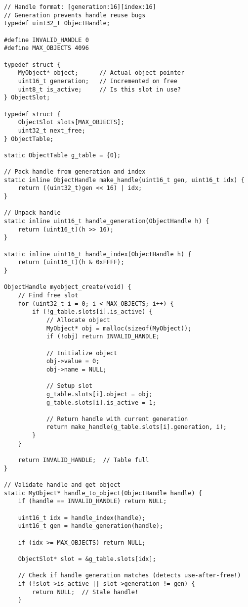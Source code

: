\begin{lstlisting}
// Handle format: [generation:16][index:16]
// Generation prevents handle reuse bugs
typedef uint32_t ObjectHandle;

#define INVALID_HANDLE 0
#define MAX_OBJECTS 4096

typedef struct {
    MyObject* object;      // Actual object pointer
    uint16_t generation;   // Incremented on free
    uint8_t is_active;     // Is this slot in use?
} ObjectSlot;

typedef struct {
    ObjectSlot slots[MAX_OBJECTS];
    uint32_t next_free;
} ObjectTable;

static ObjectTable g_table = {0};

// Pack handle from generation and index
static inline ObjectHandle make_handle(uint16_t gen, uint16_t idx) {
    return ((uint32_t)gen << 16) | idx;
}

// Unpack handle
static inline uint16_t handle_generation(ObjectHandle h) {
    return (uint16_t)(h >> 16);
}

static inline uint16_t handle_index(ObjectHandle h) {
    return (uint16_t)(h & 0xFFFF);
}

ObjectHandle myobject_create(void) {
    // Find free slot
    for (uint32_t i = 0; i < MAX_OBJECTS; i++) {
        if (!g_table.slots[i].is_active) {
            // Allocate object
            MyObject* obj = malloc(sizeof(MyObject));
            if (!obj) return INVALID_HANDLE;

            // Initialize object
            obj->value = 0;
            obj->name = NULL;

            // Setup slot
            g_table.slots[i].object = obj;
            g_table.slots[i].is_active = 1;

            // Return handle with current generation
            return make_handle(g_table.slots[i].generation, i);
        }
    }

    return INVALID_HANDLE;  // Table full
}

// Validate handle and get object
static MyObject* handle_to_object(ObjectHandle handle) {
    if (handle == INVALID_HANDLE) return NULL;

    uint16_t idx = handle_index(handle);
    uint16_t gen = handle_generation(handle);

    if (idx >= MAX_OBJECTS) return NULL;

    ObjectSlot* slot = &g_table.slots[idx];

    // Check if handle generation matches (detects use-after-free!)
    if (!slot->is_active || slot->generation != gen) {
        return NULL;  // Stale handle!
    }


\end{lstlisting}
